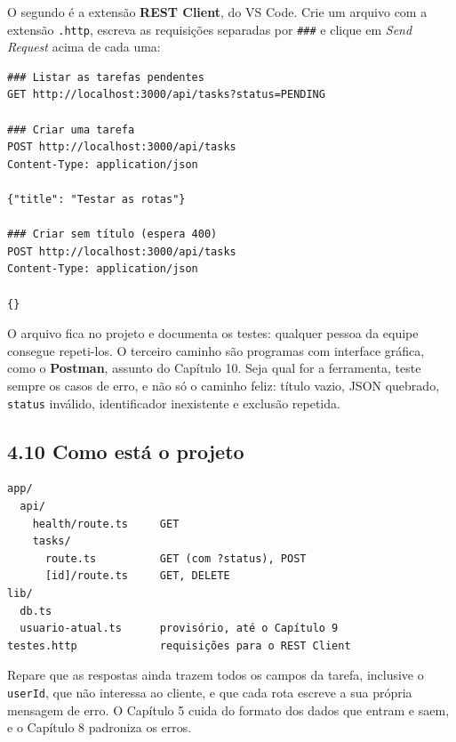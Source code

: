 O segundo é a extensão \textbf{REST Client}, do VS Code. Crie um arquivo com a extensão \texttt{.http}, escreva as requisições separadas por \texttt{\#\#\#} e clique em \textit{Send Request} acima de cada uma:

\begin{codigo}
\begin{Verbatim}[breaklines=true, breaksymbolleft={}, fontsize=\footnotesize]
### Listar as tarefas pendentes
GET http://localhost:3000/api/tasks?status=PENDING

### Criar uma tarefa
POST http://localhost:3000/api/tasks
Content-Type: application/json

{"title": "Testar as rotas"}

### Criar sem título (espera 400)
POST http://localhost:3000/api/tasks
Content-Type: application/json

{}
\end{Verbatim}
\end{codigo}

O arquivo fica no projeto e documenta os testes: qualquer pessoa da equipe consegue repeti-los. O terceiro caminho são programas com interface gráfica, como o \textbf{Postman}, assunto do Capítulo 10. Seja qual for a ferramenta, teste sempre os casos de erro, e não só o caminho feliz: título vazio, JSON quebrado, \texttt{status} inválido, identificador inexistente e exclusão repetida.

\subsection{4.10 Como está o projeto}

\begin{codigo}
\begin{Verbatim}[breaklines=true, breaksymbolleft={}, fontsize=\footnotesize]
app/
  api/
    health/route.ts     GET
    tasks/
      route.ts          GET (com ?status), POST
      [id]/route.ts     GET, DELETE
lib/
  db.ts
  usuario-atual.ts      provisório, até o Capítulo 9
testes.http             requisições para o REST Client
\end{Verbatim}
\end{codigo}

Repare que as respostas ainda trazem todos os campos da tarefa, inclusive o \texttt{userId}, que não interessa ao cliente, e que cada rota escreve a sua própria mensagem de erro. O Capítulo 5 cuida do formato dos dados que entram e saem, e o Capítulo 8 padroniza os erros.

